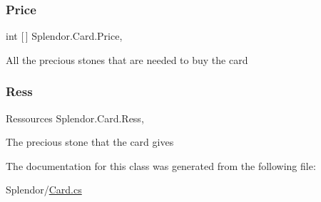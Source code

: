 \subsubsection{\texorpdfstring{Price}{Price}}
{\footnotesize\ttfamily int \mbox{[}$\,$\mbox{]} Splendor.\+Card.\+Price\hspace{0.3cm}{\ttfamily [get]}, {\ttfamily [set]}}



All the precious stones that are needed to buy the card 

\mbox{\label{class_splendor_1_1_card_afcfaa7ea5072b3cd30c04adddc8dd5c7}} 
\subsubsection{\texorpdfstring{Ress}{Ress}}
{\footnotesize\ttfamily Ressources Splendor.\+Card.\+Ress\hspace{0.3cm}{\ttfamily [get]}, {\ttfamily [set]}}



The precious stone that the card gives 



The documentation for this class was generated from the following file\+:\begin{DoxyCompactItemize}
\item 
Splendor/\hyperlink{_card_8cs}{Card.\+cs}\end{DoxyCompactItemize}
